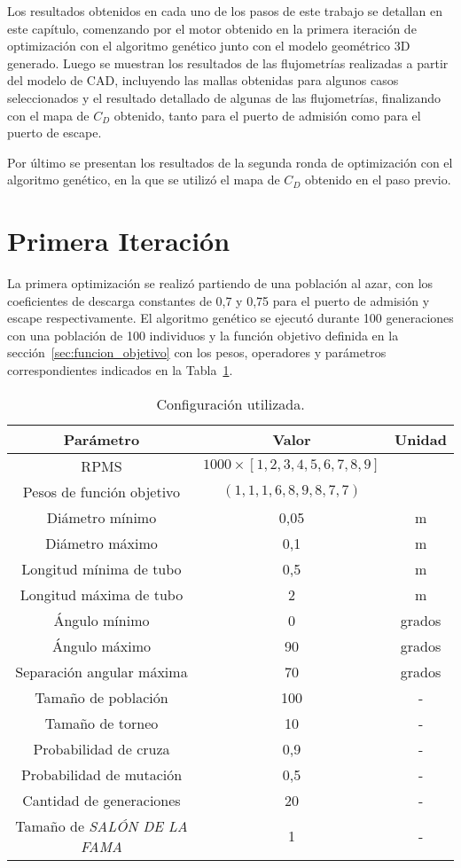 Los resultados obtenidos en cada uno de los pasos de este trabajo se detallan en
este capítulo, comenzando por el motor obtenido en la primera iteración de
optimización con el algoritmo genético junto con el modelo geométrico 3D
generado.
%
Luego se muestran los resultados de las flujometrías realizadas a partir del
modelo de CAD, incluyendo las mallas obtenidas para algunos casos seleccionados
y el resultado detallado de algunas de las flujometrías, finalizando con el mapa
de $C_{D}$ obtenido, tanto para el puerto de admisión como para
el puerto de escape.

Por último se presentan los resultados de la segunda ronda de optimización con
el algoritmo genético, en la que se utilizó el mapa de $C_{D}$ obtenido en el
paso previo.

\section{Primera Iteración}
%
La primera optimización se realizó partiendo de una población al azar, con los
coeficientes de descarga constantes de 0,7 y 0,75 para el puerto de admisión y
escape respectivamente.
%
El algoritmo genético se ejecutó durante 100 generaciones con una población de
100 individuos y la función objetivo definida en la
sección~\ref{sec:funcion_objetivo} con los pesos, operadores y
parámetros correspondientes indicados en la Tabla~\ref{tab:config_genetico}.

\begin{table}[h!]
  \centering
  \begin{tabular}{ccc} \toprule
    Parámetro & Valor & Unidad \\ \midrule
    RPMS & $1000\times[1, 2, 3, 4, 5, 6, 7, 8, 9]$ & \\
    Pesos de función objetivo & $(1, 1, 1, 6, 8, 9, 8, 7, 7)$ & \\
    Diámetro mínimo & 0,05 & m \\
    Diámetro máximo & 0,1 & m \\
    Longitud mínima de tubo & 0,5 & m \\
    Longitud máxima de tubo & 2 & m \\
    Ángulo mínimo & 0 & grados \\
    Ángulo máximo & 90 & grados \\
    Separación angular máxima & 70 & grados \\
    Tamaño de población & 100 & - \\
    Tamaño de torneo & 10 & - \\
    Probabilidad de cruza & 0,9 & - \\
    Probabilidad de mutación & 0,5 & - \\
    Cantidad de generaciones & 20 & - \\
    Tamaño de \emph{SALÓN DE LA FAMA} & 1 & - \\ \bottomrule
    \end{tabular}
  \caption{Configuración utilizada.}\label{tab:config_genetico}
\end{table}

